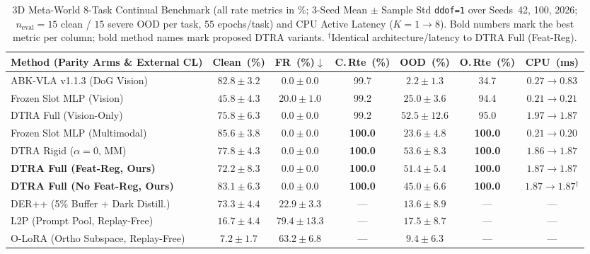\documentclass[10pt]{article}
\begin{document}
\begin{table}[ht!]
  \centering
  \caption{3D Meta-World 8-Task Continual Benchmark (all rate metrics in \%; 3-Seed Mean $\pm$ Sample Std \texttt{ddof=1} over Seeds~42, 100, 2026; $n_{\text{eval}}=15$ clean / $15$ severe OOD per task, $55$ epochs/task) and CPU Active Latency ($K=1 \to 8$). Bold numbers mark the best metric per column; bold method names mark proposed DTRA variants. $^\dagger$Identical architecture/latency to DTRA Full (Feat-Reg).}
  \label{tab:mw_3seed}
  \fontsize{8.0pt}{9.8pt}\selectfont
  \setlength{\tabcolsep}{2.6pt}
  \begin{tabular}{lcccccc}
    \toprule
    \textbf{Method (Parity Arms \& External CL)} & \textbf{Clean~(\%)} & \textbf{FR~(\%)$\downarrow$} & \textbf{C.\,Rte~(\%)} & \textbf{OOD~(\%)} & \textbf{O.\,Rte~(\%)} & \textbf{CPU~(ms)} \\
    \midrule
    ABK-VLA v1.1.3 (DoG Vision) & $82.8 \pm 3.2$ & $\mathbf{0.0 \pm 0.0}$ & 99.7 & $2.2 \pm 1.3$ & 34.7 & $0.27 \to 0.83$ \\
    Frozen Slot MLP (Vision) & $45.8 \pm 4.3$ & $20.0 \pm 1.0$ & 99.2 & $25.0 \pm 3.6$ & 94.4 & $0.21 \to 0.21$ \\
    DTRA Full (Vision-Only) & $75.8 \pm 6.3$ & $\mathbf{0.0 \pm 0.0}$ & 99.2 & $52.5 \pm 12.6$ & 95.0 & $1.97 \to 1.87$ \\
    Frozen Slot MLP (Multimodal) & $\mathbf{85.6 \pm 3.8}$ & $\mathbf{0.0 \pm 0.0}$ & \textbf{100.0} & $23.6 \pm 4.8$ & \textbf{100.0} & $\mathbf{0.21 \to 0.20}$ \\
    DTRA Rigid ($\alpha=0$, MM) & $77.8 \pm 4.3$ & $\mathbf{0.0 \pm 0.0}$ & \textbf{100.0} & $\mathbf{53.6 \pm 8.3}$ & \textbf{100.0} & $1.86 \to 1.87$ \\
    \textbf{DTRA Full (Feat-Reg, Ours)} & $72.2 \pm 8.3$ & $\mathbf{0.0 \pm 0.0}$ & \textbf{100.0} & $51.4 \pm 5.4$ & \textbf{100.0} & $1.87 \to 1.87$ \\
    \textbf{DTRA Full (No Feat-Reg, Ours)} & $83.1 \pm 6.3$ & $\mathbf{0.0 \pm 0.0}$ & \textbf{100.0} & $45.0 \pm 6.6$ & \textbf{100.0} & $1.87 \to 1.87$$^\dagger$ \\
    \midrule
    DER++ (5\% Buffer + Dark Distill.) & $73.3 \pm 4.4$ & $22.9 \pm 3.3$ & --- & $13.6 \pm 8.9$ & --- & --- \\
    L2P (Prompt Pool, Replay-Free) & $16.7 \pm 4.4$ & $79.4 \pm 13.3$ & --- & $17.5 \pm 8.7$ & --- & --- \\
    O-LoRA (Ortho Subspace, Replay-Free) & $7.2 \pm 1.7$ & $63.2 \pm 6.8$ & --- & $9.4 \pm 6.3$ & --- & --- \\
    \bottomrule
  \end{tabular}
\end{table}
\end{document}
